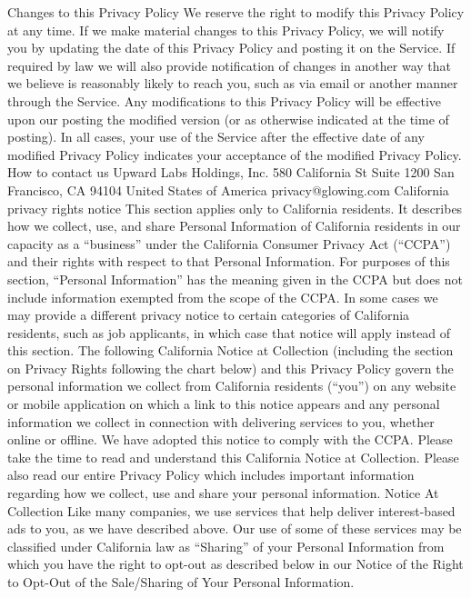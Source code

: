 Changes to this Privacy Policy
We reserve the right to modify this Privacy Policy at any time. If we make
material changes to this Privacy Policy, we will notify you by updating
the date of this Privacy Policy and posting it on the Service. If required
by law we will also provide notification of changes in another way that
we believe is reasonably likely to reach you, such as via email or another
manner through the Service. Any modifications to this Privacy Policy will
be effective upon our posting the modified version (or as otherwise
indicated at the time of posting). In all cases, your use of the Service
after the effective date of any modified Privacy Policy indicates your
acceptance of the modified Privacy Policy.
How to contact us
Upward Labs Holdings, Inc.
580 California St
Suite 1200
San Francisco, CA 94104
United States of America
privacy@glowing.com
California privacy rights notice
This section applies only to California residents. It describes how we
collect, use, and share Personal Information of California residents in our
capacity as a “business” under the California Consumer Privacy Act
(“CCPA”) and their rights with respect to that Personal Information. For
purposes of this section, “Personal Information” has the meaning given
in the CCPA but does not include information exempted from the scope
of the CCPA. In some cases we may provide a different privacy notice to
certain categories of California residents, such as job applicants, in
which case that notice will apply instead of this section.
The following California Notice at Collection (including the section on
Privacy Rights following the chart below) and this Privacy Policy govern
the personal information we collect from California residents (“you”) on
any website or mobile application on which a link to this notice appears
and any personal information we collect in connection with delivering
services to you, whether online or offline. We have adopted this notice
to comply with the CCPA. Please take the time to read and understand
this California Notice at Collection. Please also read our entire Privacy
Policy which includes important information regarding how we collect,
use and share your personal information.
Notice At Collection
Like many companies, we use services that help deliver interest-based
ads to you, as we have described above. Our use of some of these
services may be classified under California law as “Sharing” of your
Personal Information from which you have the right to opt-out as
described below in our Notice of the Right to Opt-Out of the Sale/Sharing
of Your Personal Information.
